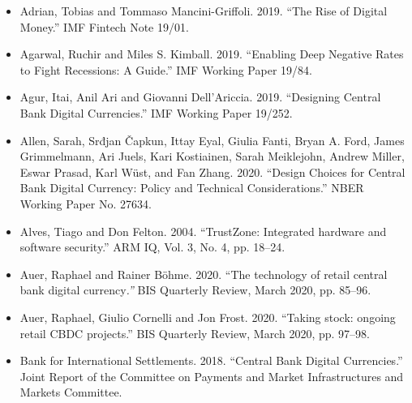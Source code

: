 \documentclass[10pt,spanish]{article}
\begin{document}
\begin{itemize}
\item Adrian, Tobias and Tommaso Mancini-Griffoli. 2019. ``The Rise of Digital
Money.'' IMF Fintech Note 19/01.
\end{itemize}

\begin{itemize}
\item Agarwal, Ruchir and Miles S. Kimball. 2019. ``Enabling Deep Negative
Rates to Fight Recessions: A Guide.'' IMF Working Paper 19/84.
\end{itemize}

\begin{itemize}
\item Agur, Itai, Anil Ari and Giovanni Dell'Ariccia. 2019. ``Designing
Central Bank Digital Currencies.'' IMF Working Paper 19/252.
\end{itemize}

\begin{itemize}
\item Allen, Sarah, Srđjan Čapkun, Ittay Eyal, Giulia Fanti, Bryan A. Ford,
James Grimmelmann, Ari Juels, Kari Kostiainen, Sarah Meiklejohn, Andrew
Miller, Eswar Prasad, Karl Wüst, and Fan Zhang. 2020. ``Design Choices
for Central Bank Digital Currency: Policy and Technical
Considerations.'' NBER Working Paper No. 27634.
\end{itemize}

\begin{itemize}
\item Alves, Tiago and Don Felton. 2004. ``TrustZone: Integrated hardware and
software security.'' ARM IQ, Vol. 3, No. 4, pp. 18--24.
\end{itemize}

\begin{itemize}
\item Auer, Raphael and Rainer Böhme. 2020. ``The technology of retail central
bank digital currency\emph{.''} BIS Quarterly Review, March 2020, pp.
85--96.
\end{itemize}

\begin{itemize}
\item Auer, Raphael, Giulio Cornelli and Jon Frost. 2020. ``Taking stock:
ongoing retail CBDC projects.'' BIS Quarterly Review, March 2020, pp.
97--98.
\end{itemize}

\begin{itemize}
\item Bank for International Settlements. 2018. ``Central Bank Digital
Currencies.'' Joint Report of the Committee on Payments and Market
Infrastructures and Markets Committee.
\end{itemize}
\end{document}

